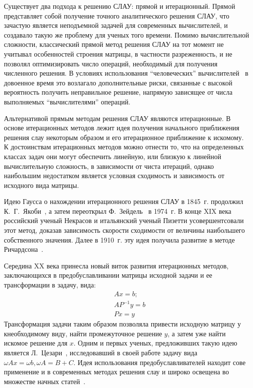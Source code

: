 Существует два подхода к решению СЛАУ: прямой и итерационный. Прямой представляет собой получение точного аналитического решения СЛАУ, что зачастую является неподъемной задачей для современных вычислителей, и создавало такую же проблему для ученых того времени. Помимо вычислительной сложности, классический прямой метод решения СЛАУ на тот момент не учитывал особенностей строения матрицы, в частности разреженность, и не позволял оптимизировать число операций, необходимый для получения численного решения. В условиях использования ``человеческих'' вычислителей~\cite{benzi} в довоенное время это возлагало дополнительные риски, связанные с высокой вероятность получить неправильное решение, напрямую зависящее от числа выполняемых ``вычислителями'' операций.


Альтернативой прямым методам решения СЛАУ являются итерационные. В основе итерационных методов лежит идея получения начального приближения решения слау некоторым образом и его итерационное приближение к искомому. К достоинствам итерационных методов можно отнести то, что на определенных классах задач они могут обеспечить линейную, или близкую к линейной вычислительную сложность, в зависимости от чиста итераций, однако наибольшим недостатком является условная сходимость и зависимость от исходного вида матрицы. 


Идею Гаусса о нахождении итерационного решения СЛАУ в 1845~г. продолжил К.~Г.~Якоби~\cite{w:jacobi}, а затем переоткрыл Ф.~Зейдель~\cite{w:seidel} в 1974~г. В конце XIX века российский ученый Некрасов и итальянский ученый Пизетти усовершентсовали этот метод, доказав зависимость скорости сходимости от величины наибольшего собственного значения. Далее в 1910~г. эту идея получила развитие в методе Ричардсона~\cite{rch_matrix}.


Середина XX века принесла новый виток развития итерационных методов, заключающихся в предобуславливании матрицы исходной задачи и ее трансформации в задачу, вида:
\begin{align*}
	&Ax = b; \\
	&AP^{-1}y = b \\
	&Px = y
\end{align*}
Трансформация задачи таким образом позволяла привести исходную матрицу у кнеобходимому виду, найти промежуточное решение $y$, а затем уже найти искомое решение для $x$. Одним и первых ученых, предложивших такую идею является Л.~Цезари~\cite{cesari_matrix}, исследовавший в своей работе задачу вида $\omega Ax = \omega b, \omega A = B + C$. Идея использования предобуславливателей находит сове применение и в современных методах решения слау и широко освещена во множестве начных статей~\cite{w:preconditioner}.


